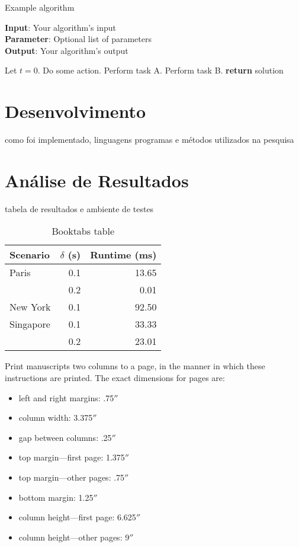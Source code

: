 \documentclass{article}
\begin{document}
\begin{algorithm}[tb]
\caption{Example algorithm}
\label{alg:algorithm}
\textbf{Input}: Your algorithm's input\\
\textbf{Parameter}: Optional list of parameters\\
\textbf{Output}: Your algorithm's output
\begin{algorithmic}[1] %
\STATE Let $t=0$.
\STATE Do some action.
\STATE Perform task A.
\ELSE
\STATE Perform task B.
\ENDIF
\ENDWHILE
\STATE \textbf{return} solution
\end{algorithmic}
\end{algorithm}


\section{Desenvolvimento}
como foi implementado, linguagens programas e 
métodos utilizados na pesquisa

\section{Análise de Resultados}
    tabela de resultados e ambiente de testes 
    
\begin{table}[h]
\centering
\begin{tabular}{lrr}
\toprule
Scenario  & $\delta$ (s) & Runtime (ms) \\
\midrule
Paris       & 0.1  & 13.65      \\
            & 0.2  & 0.01       \\
New York    & 0.1  & 92.50      \\
Singapore   & 0.1  & 33.33      \\
            & 0.2  & 23.01      \\
\bottomrule
\end{tabular}
\caption{Booktabs table}
\label{tab:booktabs}
\end{table}
    
    
Print manuscripts two columns to a page, in the manner in which these
instructions are printed. The exact dimensions for pages are:
\begin{itemize}
\item left and right margins: .75$''$
\item column width: 3.375$''$
\item gap between columns: .25$''$
\item top margin---first page: 1.375$''$
\item top margin---other pages: .75$''$
\item bottom margin: 1.25$''$
\item column height---first page: 6.625$''$
\item column height---other pages: 9$''$
\end{itemize}
\end{document}
